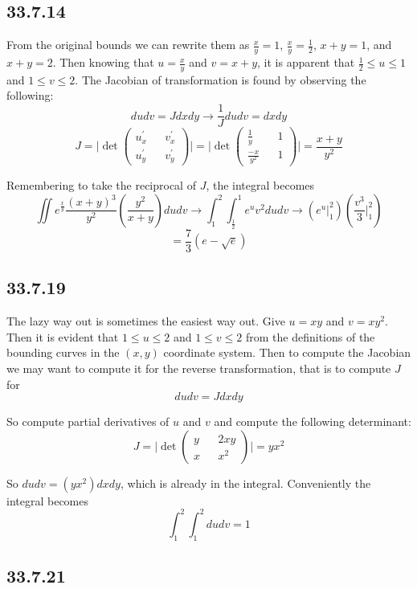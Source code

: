 \documentclass{article}
\begin{document}
\subsection{33.7.14}

From the original bounds we can rewrite them as $\frac{x}{y}=1$, $\frac{x}{y}=\frac{1}{2}$, $x+y=1$, and $x+y=2$. Then knowing that $u=\frac{x}{y}$ and $v=x+y$, it is apparent that $\frac{1}{2}\leq u \leq 1$ and $1\leq v \leq 2$. The Jacobian of transformation is found by observing the following:
$$dudv = J dxdy \to \frac{1}{J}dudv = dxdy$$
$$J = \bigg| \det \begin{pmatrix}
   u^{\prime}_x && v^{\prime}_x \\
   u^{\prime}_y && v^{\prime}_y
\end{pmatrix} \bigg| = \bigg| \det \begin{pmatrix}
    \frac{1}{y} && 1 \\
    \frac{-x}{y^2} && 1
 \end{pmatrix} \bigg| = \frac{x+y}{y^2}$$

 Remembering to take the reciprocal of $J$, the integral becomes $$\iint e^{\frac{x}{y}}\frac{(x+y)^3}{y^2}\left(\frac{y^2}{x+y}\right)dudv \to \int_1^2\int_{\frac{1}{2}}^1 e^u v^2 dudv \to \left(e^u|_1^2\right)\left(\frac{v^3}{3}\bigg|_1^2\right) $$
 $$= \frac{7}{3}(e-\sqrt{e})$$

\subsection{33.7.19}

The lazy way out is sometimes the easiest way out. Give $u = xy$ and $v = xy^2$. Then it is evident that $1\leq u \leq 2$ and $1\leq v \leq 2$ from the definitions of the bounding curves in the $(x,y)$ coordinate system. Then to compute the Jacobian we may want to compute it for the reverse transformation, that is to compute $J$ for $$dudv = Jdxdy$$

So compute partial derivatives of $u$ and $v$ and compute the following determinant: $$J = \bigg|\det \begin{pmatrix}
    y && 2xy \\
    x && x^2
\end{pmatrix}\bigg| = yx^2$$

So $dudv = (yx^2)dxdy$, which is already in the integral. Conveniently the integral becomes $$\int_1^2\int_1^2 dudv = 1$$

\subsection{33.7.21}
\end{document}
